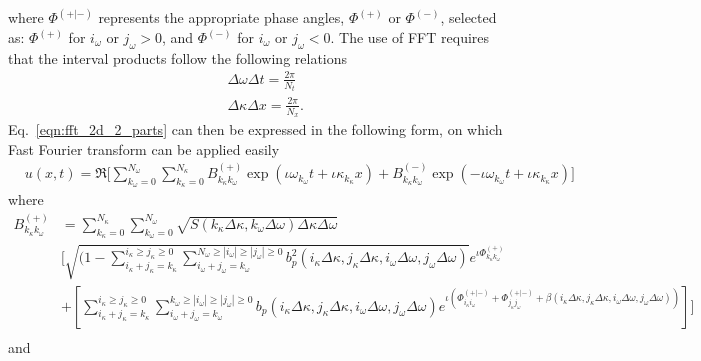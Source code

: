 \documentclass[preprint, review, 12pt]{elsarticle}
\begin{document}
where $\Phi^{(+|-)}$ represents the appropriate phase angles, $\Phi^{(+)}$ or $\Phi^{(-)}$, selected as: $\Phi^{(+)}$ for $i_{\omega}$ or $j_{\omega} > 0$, and $\Phi^{(-)}$ for $i_{\omega}$ or $j_{\omega} < 0$. The use of FFT requires that the interval products follow the following relations
\begin{equation}
\begin{aligned}
	& \Delta \omega \Delta t = \frac{2 \pi}{N_t} \\
	& \Delta \kappa \Delta x = \frac{2 \pi}{N_x}.
\end{aligned}
\end{equation}
Eq.\ \eqref{eqn:fft_2d_2_parts} can then be expressed in the following form, on which Fast Fourier transform can be applied easily
\begin{equation}
\begin{aligned}
	&u(x, t) = \Re \Bigg[ \sum_{k_\omega=0}^{N_\omega} \sum_{k_\kappa=0}^{N_\kappa} B_{k_\kappa k_\omega}^{(+)} \exp(\iota \omega_{k_\omega}t + \iota \kappa_{k_\kappa} x) + B_{k_\kappa k_\omega}^{(-)} \exp(-\iota \omega_{k_\omega}t + \iota \kappa_{k_\kappa} x) \Bigg]
\end{aligned}
\end{equation}
where
\begin{equation}
\begin{aligned}
	B^{(+)}_{k_\kappa k_\omega } &= \sum_{k_\kappa=0}^{N_\kappa}\sum_{k_\omega=0}^{N_\omega} \sqrt{S(k_\kappa \Delta \kappa, k_\omega \Delta \omega) \Delta\kappa \Delta\omega}\\
    & \Big[ \sqrt{(1 - \sum_{i_\kappa + j_\kappa = k_\kappa }^{i_\kappa \geq j_\kappa \geq 0}\sum_{i_\omega + j_\omega = k_\omega }^{N_\omega \geq |i_\omega| \geq |j_\omega| \geq 0}b_{p}^{2}(i_\kappa \Delta \kappa, j_\kappa \Delta \kappa, i_\omega \Delta \omega, j_\omega \Delta \omega)} e^{\iota\Phi_{k_\kappa k_\omega}^{(+)}}\\
    & + [\sum_{i_\kappa + j_\kappa = k_\kappa}^{i_\kappa \geq j_\kappa \geq 0}\sum_{i_\omega + j_\omega = k_\omega}^{k_{\omega} \geq |i_{\omega}| \geq |j_{\omega}| \geq 0} b_{p}(i_\kappa \Delta \kappa, j_\kappa \Delta \kappa, i_{\omega} \Delta \omega, j_{\omega} \Delta \omega) e^{\iota(\Phi_{i_\kappa i_{\omega}}^{(+|-)} + \Phi_{j_\kappa j_{\omega}}^{(+|-)} +\beta(i_\kappa \Delta \kappa, j_\kappa \Delta \kappa, i_{\omega} \Delta \omega, j_{\omega} \Delta \omega))}] \Big]\\
\end{aligned}
\end{equation}
and
\end{document}

